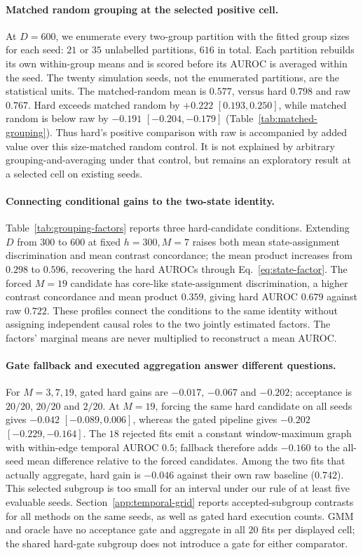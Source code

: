 \documentclass[11pt]{article}
\begin{document}
\paragraph{Matched random grouping at the selected positive cell.}
At $D=600$, we enumerate every two-group partition with the fitted group sizes
for each seed: $21$ or $35$ unlabelled partitions, $616$ in total. Each partition
rebuilds its own within-group means and is scored before its AUROC is averaged
within the seed. The twenty simulation seeds, not the enumerated partitions,
are the statistical units. The matched-random mean is $0.577$, versus hard
$0.798$ and raw $0.767$. Hard exceeds matched random by $+0.222$
$[0.193,0.250]$, while matched random is below raw by $-0.191$
$[-0.204,-0.179]$ (Table~\ref{tab:matched-grouping}). Thus hard's positive
comparison with raw is accompanied by added value over this size-matched random
control. It is not explained by arbitrary grouping-and-averaging under that
control, but remains an exploratory result at a selected cell on existing seeds.

\paragraph{Connecting conditional gains to the two-state identity.}
Table~\ref{tab:grouping-factors} reports three hard-candidate
conditions. Extending $D$ from $300$ to $600$ at fixed $h=300,M=7$ raises both
mean state-assignment discrimination and mean contrast concordance; the mean product
increases from $0.298$ to $0.596$, recovering the hard AUROCs through
Eq.~\eqref{eq:state-factor}. The forced $M=19$ candidate has core-like state-assignment
discrimination, a higher contrast concordance and mean product $0.359$, giving
hard AUROC $0.679$ against raw $0.722$. These profiles connect the conditions
to the same identity without assigning independent causal roles to the two
jointly estimated factors. The factors' marginal means are never multiplied
to reconstruct a mean AUROC.

\paragraph{Gate fallback and executed aggregation answer different questions.}
For $M=3,7,19$, gated hard gains are $-0.017$, $-0.067$ and $-0.202$;
acceptance is $20/20$, $20/20$ and $2/20$. At $M=19$, forcing the same hard
candidate on all seeds gives $-0.042$ $[-0.089,0.006]$, whereas the gated
pipeline gives $-0.202$ $[-0.229,-0.164]$. The $18$ rejected fits emit a
constant window-maximum graph with within-edge temporal AUROC $0.5$; fallback therefore
adds $-0.160$ to the all-seed mean difference relative to the forced candidates.
Among the two fits that actually aggregate, hard gain is $-0.046$ against their
own raw baseline ($0.742$). This selected subgroup is too small for an interval
under our rule of at least five evaluable seeds. Section~\ref{app:temporal-grid}
reports accepted-subgroup contrasts for all methods on the same seeds, as well
as gated hard execution counts. GMM and oracle have no acceptance gate and aggregate
in all $20$ fits per displayed cell; the shared hard-gate subgroup does not
introduce a gate for either comparator.
\end{document}
